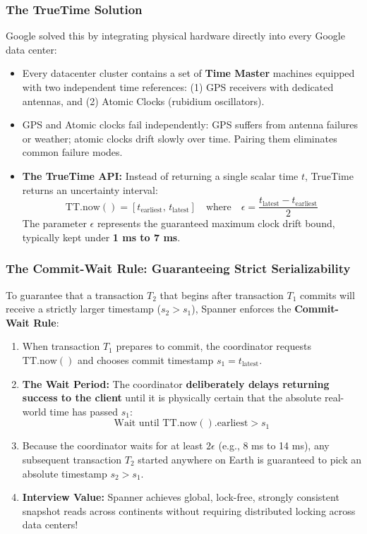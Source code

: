 \documentclass[10pt,journal,compsoc,onecolumn]{IEEEtran}
\begin{document}
\subsubsection{The TrueTime Solution}
Google solved this by integrating physical hardware directly into every Google data center:
\begin{itemize}
    \item Every datacenter cluster contains a set of \textbf{Time Master} machines equipped with two independent time references: (1) GPS receivers with dedicated antennas, and (2) Atomic Clocks (rubidium oscillators).
    \item GPS and Atomic clocks fail independently: GPS suffers from antenna failures or weather; atomic clocks drift slowly over time. Pairing them eliminates common failure modes.
    \item \textbf{The TrueTime API:} Instead of returning a single scalar time $t$, TrueTime returns an uncertainty interval:
    \begin{equation}
        \text{TT.now}() = [t_{\text{earliest}}, \, t_{\text{latest}}] \quad \text{where} \quad \epsilon = \frac{t_{\text{latest}} - t_{\text{earliest}}}{2}
    \end{equation}
    The parameter $\epsilon$ represents the guaranteed maximum clock drift bound, typically kept under \textbf{1 ms to 7 ms}.
\end{itemize}

\subsubsection{The Commit-Wait Rule: Guaranteeing Strict Serializability}
To guarantee that a transaction $T_2$ that begins after transaction $T_1$ commits will receive a strictly larger timestamp ($s_2 > s_1$), Spanner enforces the \textbf{Commit-Wait Rule}:
\begin{enumerate}
    \item When transaction $T_1$ prepares to commit, the coordinator requests $\text{TT.now}()$ and chooses commit timestamp $s_1 = t_{\text{latest}}$.
    \item \textbf{The Wait Period:} The coordinator \textbf{deliberately delays returning success to the client} until it is physically certain that the absolute real-world time has passed $s_1$:
    \begin{equation}
        \text{Wait until } \text{TT.now}().\text{earliest} > s_1
    \end{equation}
    \item Because the coordinator waits for at least $2\epsilon$ (e.g., 8 ms to 14 ms), any subsequent transaction $T_2$ started anywhere on Earth is guaranteed to pick an absolute timestamp $s_2 > s_1$.
    \item \textbf{Interview Value:} Spanner achieves global, lock-free, strongly consistent snapshot reads across continents without requiring distributed locking across data centers!
\end{enumerate}
\end{document}
